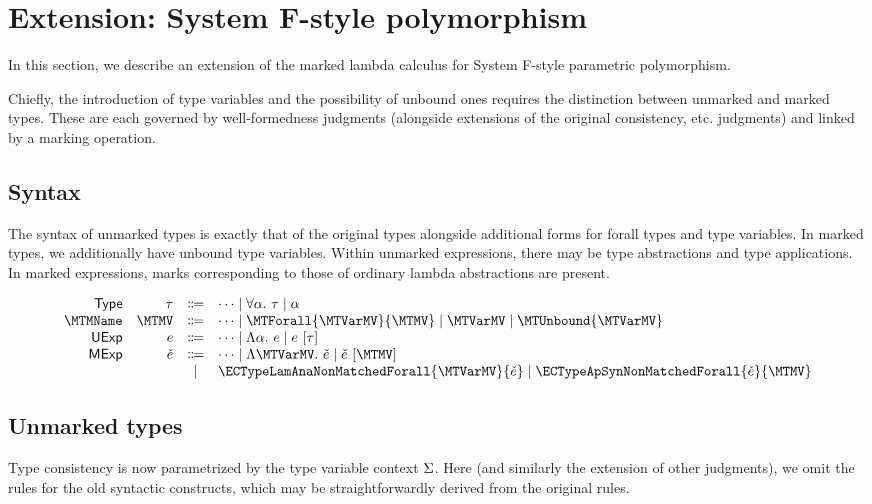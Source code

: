 \documentclass[formalism.tex]{subfiles}
\begin{document}





\section{Extension: System F-style polymorphism}
\label{sec:polymorphism}
In this section, we describe an extension of the marked lambda calculus for System F-style
parametric polymorphism.

Chiefly, the introduction of type variables and the possibility of unbound ones requires the
distinction between unmarked and marked types. These are each governed by well-formedness judgments
(alongside extensions of the original consistency, etc. judgments) and linked by a marking
operation.

\subsection{Syntax}
\label{sec:polymorphism-syntax}
The syntax of unmarked types is exactly that of the original types alongside additional forms for
forall types and type variables. In marked types, we additionally have unbound type variables.
Within unmarked expressions, there may be type abstractions and type applications. In marked
expressions, marks corresponding to those of ordinary lambda abstractions are present.

\[\begin{array}{rrcl}
  \TMName  & \TMV  & \Coloneqq & \cdots \mid \TForall{\TVarMV}{\TMV} \mid \TVarMV \\
  \MTMName & \MTMV & \Coloneqq & \cdots
                     \mid \MTForall{\MTVarMV}{\MTMV} \mid \MTVarMV \mid \MTUnbound{\MTVarMV} \\
  \EMName  & \EMV  & \Coloneqq & \cdots \mid \ETypeLam{\TVarMV}{\EMV} \mid \ETypeAp{\EMV}{\TMV} \\
  \ECMName & \ECMV & \Coloneqq & \cdots \mid \ECTypeLam{\MTVarMV}{\ECMV} \mid \ECTypeAp{\ECMV}{\MTMV} \\
           &       & \mid         & \ECTypeLamAnaNonMatchedForall{\MTVarMV}{\ECMV} \mid \ECTypeApSynNonMatchedForall{\ECMV}{\MTMV}
\end{array}\]

\subsection{Unmarked types}
\label{sec:polymorphism-unmarked-types}
Type consistency is now parametrized by the type variable context $\Sigma$. Here (and similarly
the extension of other judgments), we omit the rules for the old syntactic constructs, which may be
straightforwardly derived from the original rules. \\
\end{document}
